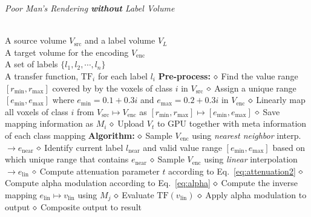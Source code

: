 \documentclass{egpubl}
\begin{document}
\begin{algorithm}[t]
\caption{\label{code:2} \emph{Poor Man's Rendering \textbf{without} Label Volume}}
\begin{algorithmic}
\REQUIRE \quad\\
A source volume $V_\mathrm{src}$ and a label volume $V_L$\\
A target volume for the encoding $V_\mathrm{enc}$\\
A set of labels $\{ l_1, l_2, \cdots, l_n \}$ \\
A transfer function, $\mathrm{TF}_i$ for each label $l_i$ 
\STATE \hspace{-3mm}\textbf{Pre-process:}
 \nonumber
\STATE $\diamond$ Find the value range $[r_\mathrm{min}, r_\mathrm{max}]$ covered by by the voxels of class $i$ in $V_\mathrm{src}$
\STATE $\diamond$ Assign a unique range $[e_\mathrm{min},e_\mathrm{max}]$ where $e_\mathrm{min} = 0.1+0.3 i$ and $e_\mathrm{max} = 0.2+0.3 i$ in $V_\mathrm{enc}$
\STATE $\diamond$ Linearly map all voxels of class $i$ from $V_\mathrm{src} \mapsto V_\mathrm{enc}$ as $[r_\mathrm{min}, r_\mathrm{max}] \mapsto [e_\mathrm{min},e_\mathrm{max}]$
\STATE $\diamond$ Save mapping information as $M_i$
\ENDFOR
\STATE $\diamond$ Upload $V_t$ to GPU together with meta information of each class mapping
\STATE \hspace{-3mm}\textbf{Algorithm:}
 \nonumber
\STATE $\diamond$ Sample $V_\mathrm{enc}$ using \emph{nearest neighbor} interp. $\rightarrow e_\mathrm{near}$
\STATE $\diamond$ Identify current label $l_\mathrm{near}$ and valid value range $[e_\mathrm{min}, e_\mathrm{max}]$ based on which unique range that contains $e_\mathrm{near}$ 
\STATE $\diamond$ Sample $V_\mathrm{enc}$ using \emph{linear} interpolation $\rightarrow e_\mathrm{lin}$
\STATE $\diamond$ Compute attenuation parameter $t$ according to Eq.~\ref{eq:attenuation2}
\STATE $\diamond$ Compute alpha modulation according to Eq.~\ref{eq:alpha}
\STATE $\diamond$ Compute the inverse mapping $e_\mathrm{lin} \mapsto v_\mathrm{lin}$ using $M_j$
\STATE $\diamond$ Evaluate $\mathrm{TF}(v_\mathrm{lin})$ 
\STATE $\diamond$ Apply alpha modulation to output
\STATE $\diamond$ Composite output to result
\ENDFOR
\end{algorithmic}
\end{algorithm}
\end{document}
